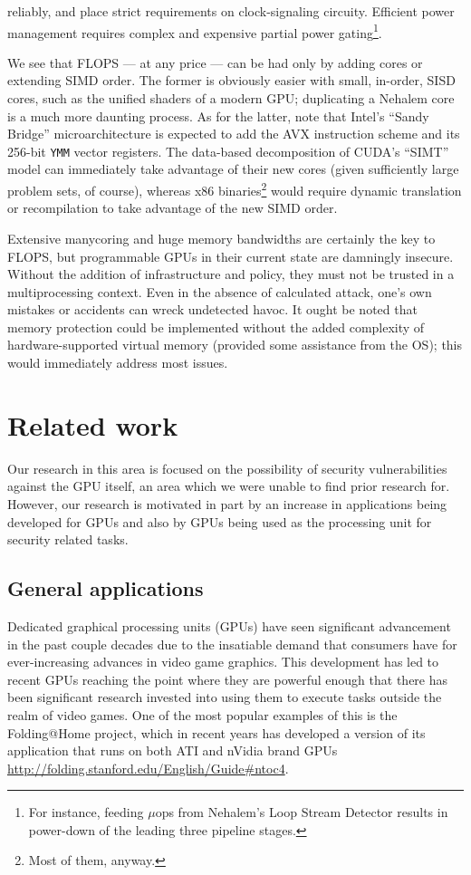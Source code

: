\documentclass[letterpaper,10pt]{article}
\begin{document}
\begin{multicols}{2}
\begin{itemize}
reliably, and place strict requirements on clock-signaling circuity. Efficient
power management requires complex and expensive partial power gating\footnote{For
instance, feeding $\mu$ops from Nehalem's Loop Stream Detector results in power-down
of the leading three pipeline stages.}.
\end{itemize}
We see that FLOPS --- at any price --- can be had only by adding cores or extending
SIMD order. The former is obviously easier with small, in-order, SISD cores,
such as the unified shaders of a modern GPU\@; duplicating a Nehalem core is a
much more daunting process. As for the latter, note that Intel's ``Sandy
Bridge'' microarchitecture is expected to add the AVX instruction scheme and
its 256-bit \texttt{YMM} vector registers\cite{avx}. The data-based decomposition of CUDA's
``SIMT'' model can immediately take advantage of their new cores (given
sufficiently large problem sets, of course), whereas x86 binaries\footnote{Most of them, anyway.} would
require dynamic translation or recompilation to take advantage of the new SIMD
order.

Extensive manycoring and huge memory bandwidths are certainly the key to FLOPS,
but programmable GPUs in their current state are damningly insecure. Without the
addition of infrastructure and policy, they must not be trusted in a
multiprocessing context. Even in the absence of calculated attack, one's own
mistakes or accidents can wreck undetected havoc. It ought be noted that memory
protection could be implemented without the added complexity of
hardware-supported virtual memory (provided some assistance from the OS); this
would immediately address most issues.

\section{Related work}
Our research in this area is focused on the possibility of security
vulnerabilities against the GPU itself, an area which we were unable to find
prior research for. However, our research is motivated in part by an increase
in applications being developed for GPUs and also by GPUs being used as the
processing unit for security related tasks.
  
\subsection{General applications}
  
  Dedicated graphical processing units (GPUs) have seen significant advancement
in the past couple decades due to the insatiable demand that consumers have for
ever-increasing advances in video game graphics. This development has led to
recent GPUs reaching the point where they are powerful enough that there has
been significant research invested into using them to execute tasks outside the
realm of video games. One of the most popular examples of this is the
Folding@Home project, which in recent years has developed a version of its
application that runs on both ATI and nVidia brand GPUs
\url{http://folding.stanford.edu/English/Guide#ntoc4}.
  

\end{multicols}
\end{document}

